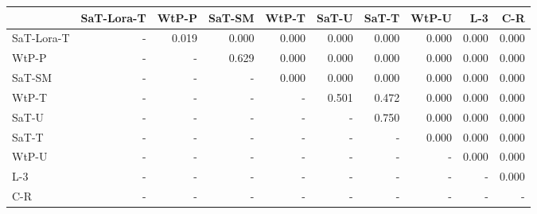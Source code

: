 \begin{tabular}{lrrrrrrrrr}
\toprule
 & SaT-Lora-T & WtP-P & SaT-SM & WtP-T & SaT-U & SaT-T & WtP-U & L-3 & C-R \\
\midrule
SaT-Lora-T & - & 0.019 & 0.000 & 0.000 & 0.000 & 0.000 & 0.000 & 0.000 & 0.000 \\
WtP-P & - & - & 0.629 & 0.000 & 0.000 & 0.000 & 0.000 & 0.000 & 0.000 \\
SaT-SM & - & - & - & 0.000 & 0.000 & 0.000 & 0.000 & 0.000 & 0.000 \\
WtP-T & - & - & - & - & 0.501 & 0.472 & 0.000 & 0.000 & 0.000 \\
SaT-U & - & - & - & - & - & 0.750 & 0.000 & 0.000 & 0.000 \\
SaT-T & - & - & - & - & - & - & 0.000 & 0.000 & 0.000 \\
WtP-U & - & - & - & - & - & - & - & 0.000 & 0.000 \\
L-3 & - & - & - & - & - & - & - & - & 0.000 \\
C-R & - & - & - & - & - & - & - & - & - \\
\bottomrule
\end{tabular}

